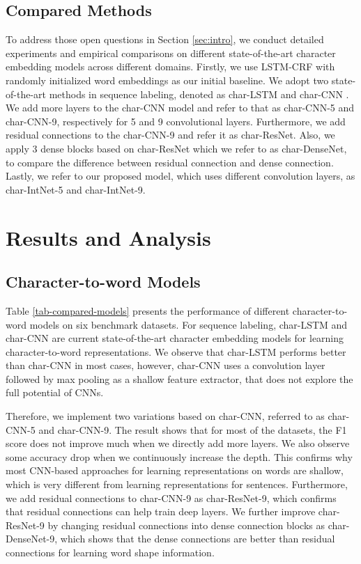 \documentclass[11pt,a4paper]{article}
\begin{document}
\subsection{Compared Methods} 

To address those open questions in Section \ref{sec:intro}, we conduct detailed experiments and empirical comparisons on different state-of-the-art character embedding models across different domains. Firstly, we use LSTM-CRF with randomly initialized word embeddings as our initial baseline. We adopt two state-of-the-art methods in sequence labeling, denoted as char-LSTM \cite{lample2016neural} and char-CNN \cite{ma2016end}. We add more layers to the char-CNN model and refer to that as char-CNN-5 and char-CNN-9, respectively for 5 and 9 convolutional layers. Furthermore, we add residual connections to the char-CNN-9 and refer it as char-ResNet. Also, we apply 3 dense blocks based on char-ResNet which we refer to as char-DenseNet, to compare the difference between residual connection and dense connection. Lastly, we refer to our proposed model, which uses different convolution layers, as char-IntNet-5 and char-IntNet-9.
 
\section{Results and Analysis}
\label{sec:results}

\subsection{Character-to-word Models}

Table \ref{tab-compared-models} presents the performance of different character-to-word models on six benchmark datasets. For sequence labeling, char-LSTM and char-CNN are current state-of-the-art character embedding models for learning character-to-word representations. We observe that char-LSTM performs better than char-CNN in most cases, however, char-CNN uses a convolution layer followed by max pooling as a shallow feature extractor, that does not explore the full potential of CNNs. 

Therefore, we implement two variations based on char-CNN, referred to as char-CNN-5 and char-CNN-9. The result shows that for most of the datasets, the F1 score does not improve much when we directly add more layers. We also observe some accuracy drop when we continuously increase the depth. This confirms why most CNN-based approaches for learning representations on words are shallow, which is very different from learning representations for sentences. Furthermore, we add residual connections to char-CNN-9 as char-ResNet-9, which confirms that residual connections can help train deep layers. We further improve char-ResNet-9 by changing residual connections into dense connection blocks as char-DenseNet-9, which shows that the dense connections are better than residual connections for learning word shape information.
\end{document}
